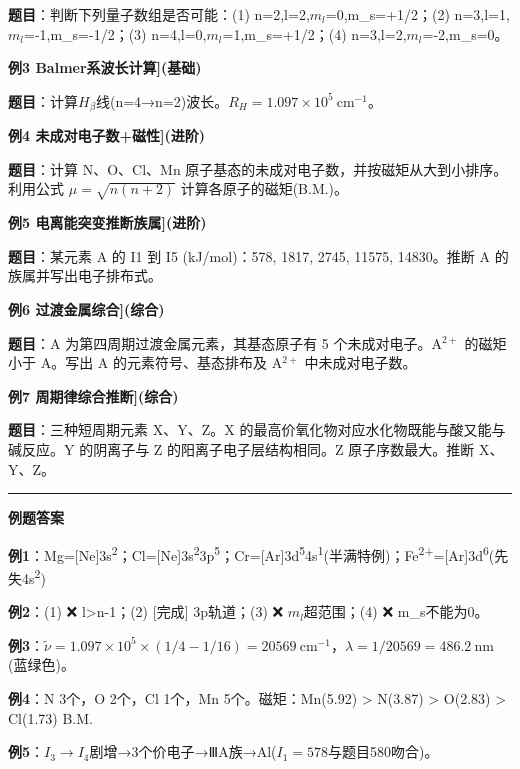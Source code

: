 \textbf{题目}：判断下列量子数组是否可能：(1) n=2,l=2,\(m_l\)=0,m\_s=+1/2；(2) n=3,l=1,\(m_l\)=-1,m\_s=-1/2；(3) n=4,l=0,\(m_l\)=1,m\_s=+1/2；(4) n=3,l=2,\(m_l\)=-2,m\_s=0。

\textbf{例3 Balmer系波长计算{]}(基础)}

\textbf{题目}：计算\(H_\beta\)线(n=4→n=2)波长。\(R_H=1.097\times10^5\ \mathrm{cm^{-1}}\)。

\textbf{例4 未成对电子数+磁性{]}(进阶)}

\textbf{题目}：计算 N、O、Cl、Mn 原子基态的未成对电子数，并按磁矩从大到小排序。利用公式 \(\mu = \sqrt{n(n+2)}\) 计算各原子的磁矩(B.M.)。

\textbf{例5 电离能突变推断族属{]}(进阶)}

\textbf{题目}：某元素 A 的 I1 到 I5 (kJ/mol)：578, 1817, 2745, 11575, 14830。推断 A 的族属并写出电子排布式。

\textbf{例6 过渡金属综合{]}(综合)}

\textbf{题目}：A 为第四周期过渡金属元素，其基态原子有 5 个未成对电子。A\(^{2+}\) 的磁矩小于 A。写出 A 的元素符号、基态排布及 A\(^{2+}\) 中未成对电子数。

\textbf{例7 周期律综合推断{]}(综合)}

\textbf{题目}：三种短周期元素 X、Y、Z。X 的最高价氧化物对应水化物既能与酸又能与碱反应。Y 的阴离子与 Z 的阳离子电子层结构相同。Z 原子序数最大。推断 X、Y、Z。

\begin{center}\rule{0.5\linewidth}{0.5pt}\end{center}

\textbf{例题答案}

\textbf{例1}：Mg={[}Ne{]}3s\textsuperscript{2}；Cl={[}Ne{]}3s\textsuperscript{2}3p\textsuperscript{5}；Cr={[}Ar{]}3d\textsuperscript{5}4s\textsuperscript{1}(半满特例)；Fe\textsuperscript{2+}={[}Ar{]}3d\textsuperscript{6}(先失4s\textsuperscript{2})

\textbf{例2}：(1) ❌ l\textgreater n-1；(2) {[}完成{]} 3p轨道；(3) ❌ \(m_l\)超范围；(4) ❌ m\_s不能为0。

\textbf{例3}：\(\tilde{\nu}=1.097\times10^5\times(1/4-1/16)=20569\ \mathrm{cm^{-1}}\)，\(\lambda=1/20569=486.2\ \mathrm{nm}\)(蓝绿色)。

\textbf{例4}：N 3个，O 2个，Cl 1个，Mn 5个。磁矩：Mn(5.92) \textgreater{} N(3.87) \textgreater{} O(2.83) \textgreater{} Cl(1.73) B.M.

\textbf{例5}：\(I_3\to I_4\)剧增→3个价电子→ⅢA族→Al(\(I_1=578\)与题目580吻合)。

